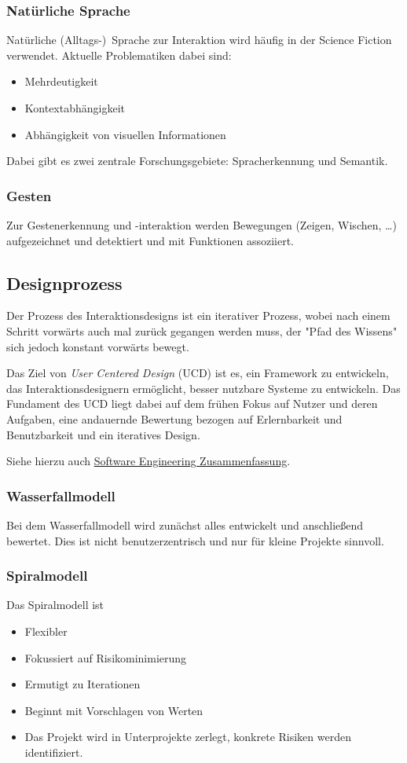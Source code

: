 			\subsubsection{Natürliche Sprache}
				Natürliche (Alltags-)~Sprache zur Interaktion wird häufig in der Science Fiction verwendet. Aktuelle Problematiken dabei sind:
				\begin{itemize}
					\item Mehrdeutigkeit
					\item Kontextabhängigkeit
					\item Abhängigkeit von visuellen Informationen
				\end{itemize}
				Dabei gibt es zwei zentrale Forschungsgebiete: Spracherkennung und Semantik.

			\subsubsection{Gesten}
				Zur Gestenerkennung und -interaktion werden Bewegungen (Zeigen, Wischen, \dots) aufgezeichnet und detektiert und mit Funktionen assoziiert.

		\subsection{Designprozess}
			Der Prozess des Interaktionsdesigns ist ein iterativer Prozess, wobei nach einem Schritt vorwärts auch mal zurück gegangen werden muss, der "Pfad des Wissens" sich jedoch konstant vorwärts bewegt.
			
			Das Ziel von \emph{User Centered Design} (UCD) ist es, ein Framework zu entwickeln, das Interaktionsdesignern ermöglicht, besser nutzbare Systeme zu entwickeln. Das Fundament des UCD liegt dabei auf dem frühen Fokus auf Nutzer und deren Aufgaben, eine andauernde Bewertung bezogen auf Erlernbarkeit und Benutzbarkeit und ein iteratives Design.
			
			Siehe hierzu auch \href{https://projects.frisp.org/documents/12}{Software Engineering Zusammenfassung}.

			\subsubsection{Wasserfallmodell}
				Bei dem Wasserfallmodell wird zunächst alles entwickelt und anschließend bewertet. Dies ist nicht benutzerzentrisch und nur für kleine Projekte sinnvoll.

			\subsubsection{Spiralmodell}
				Das Spiralmodell ist
				\begin{itemize}
					\item Flexibler
					\item Fokussiert auf Risikominimierung
					\item Ermutigt zu Iterationen
					\item Beginnt mit Vorschlagen von Werten
					\item Das Projekt wird in Unterprojekte zerlegt, konkrete Risiken werden identifiziert.
				\end{itemize}

